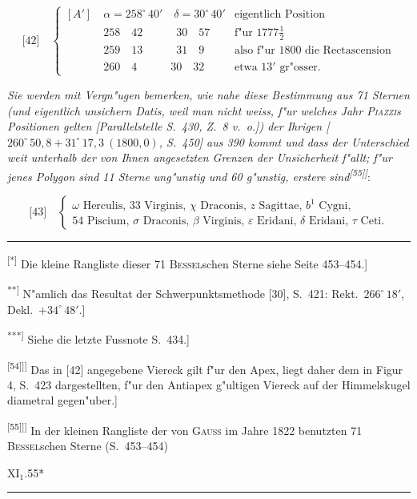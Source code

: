 \documentclass[12pt,a4paper]{article}
\theoremstyle{plain}
\theoremstyle{definition}
\theoremstyle{remark}
\begin{document}
\[
\text{[42]}\quad
\left\{\begin{array}{lll}
[A']\quad \alpha = 258^{\circ}\,40'\quad \delta = 30^{\circ}\,40' & \text{eigentlich Position}\\
\phantom{[A']}\quad 258\quad 42\quad\quad\quad 30\quad 57 & \text{f"ur }1777\tfrac{1}{2}\\
\phantom{[A']}\quad 259\quad 13\quad\quad\quad 31\quad 9 & \text{also f"ur 1800 die Rectascension}\\
\phantom{[A']}\quad 260\quad 4\quad\quad\quad 30\quad 32 & \text{etwa }13'\text{ gr"osser.}
\end{array}\right.
\]

{\itshape Sie werden mit Vergn"ugen bemerken, wie nahe diese Bestimmung aus 71 Sternen (und eigentlich unsichern Datis, weil man nicht weiss, f"ur welches Jahr \textsc{Piazzi}s Positionen gelten [Parallelstelle S.\ 430, Z.\ 8 v.\ o.]) der Ihrigen [$260^{\circ}\,50{,}8 + 31^{\circ}\,17{,}3\ (1800{,}0)$, S.\ 450] aus 390 kommt und dass der Unterschied weit unterhalb der von Ihnen angesetzten Grenzen der Unsicherheit f"allt; f"ur jenes Polygon sind 11 Sterne ung"unstig und 60 g"unstig, erstere sind\textsuperscript{[55]\textdagger\textdagger]}}:

\[
\text{[43]}\quad
\left\{\begin{array}{lll}
\omega\text{ Herculis, }33\text{ Virginis, }\chi\text{ Draconis, }z\text{ Sagittae, }b^1\text{ Cygni,}\\
54\text{ Piscium, }\sigma\text{ Draconis, }\beta\text{ Virginis, }\varepsilon\text{ Eridani, }\delta\text{ Eridani, }\tau\text{ Ceti.}
\end{array}\right.
\]

\rule{\textwidth}{0.4pt}
{\small
\textsuperscript{[*]} Die kleine Rangliste dieser 71 \textsc{Bessel}schen Sterne siehe Seite 453--454.]

\textsuperscript{**]} N"amlich das Resultat der Schwerpunktsmethode [30], S.\ 421: Rekt.\ $266^{\circ}\,18'$, Dekl.\ $+34^{\circ}\,48'$.]

\textsuperscript{***]} Siehe die letzte Fussnote S.\ 434.]

\textsuperscript{[54]\textdagger]]} Das in [42] angegebene Viereck gilt f"ur den Apex, liegt daher dem in Figur 4, S.\ 423 dargestellten, f"ur den Antiapex g"ultigen Viereck auf der Himmelskugel diametral gegen"uber.]

\textsuperscript{[55]\textdagger\textdagger]]} In der kleinen Rangliste der von \textsc{Gauss} im Jahre 1822 benutzten 71 \textsc{Bessel}schen Sterne (S.\ 453--454)

\hfill\textsc{XI}$_1$.\hfill55*
}
\rule{\textwidth}{0.4pt}
\end{document}
